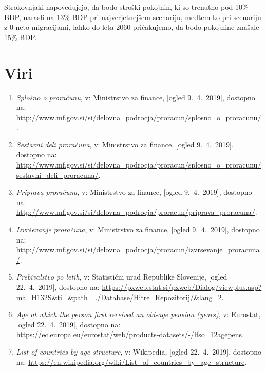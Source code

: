 \documentclass[12pt, a4paper]{article}
\begin{document}
\hspace*{5mm} Strokovnjaki napovedujejo, da bodo stroški pokojnin, ki so trenutno pod 10\% BDP, narasli na 13\% BDP pri najverjetnejšem scenariju, medtem ko pri scenariju z 0 neto migracijami, lahko do leta 2060 pričakujemo, da bodo pokojnine znašale 15\% BDP.

\newpage

\section[Viri]{Viri}
\begin{enumerate}
\item
\label{Splošno o proračunu}
\emph{Splošno o proračunu}, v: Ministrstvo za finance, [ogled 9.~4.~2019], dostopno na: \url{http://www.mf.gov.si/si/delovna_podrocja/proracun/splosno_o_proracunu/}.

\item
\label{Sestavni deli}
\emph{Sestavni deli proračuna}, v: Ministrstvo za finance, [ogled 9.~4.~2019], dostopno na: \url{http://www.mf.gov.si/si/delovna_podrocja/proracun/splosno_o_proracunu/sestavni_deli_proracuna/}.

\item
\label{Priprava proračuna}
\emph{Priprava proračuna}, v: Ministrstvo za finance, [ogled 9.~4.~2019], dostopno na: \url{http://www.mf.gov.si/si/delovna_podrocja/proracun/priprava_proracuna/}.

\item
\label{Izvrševanje proračuna}
\emph{Izvrševanje proračuna}, v: Ministrstvo za finance, [ogled 9.~4.~2019], dostopno na: \url{http://www.mf.gov.si/si/delovna_podrocja/proracun/izvrsevanje_proracuna/}.

\item
\label{Prebivalstvo Slovenije}
\emph{Prebivalstvo po letih}, v: Statistični urad Republike Slovenije, [ogled 22.~4.~2019], dostopno na: \url{https://pxweb.stat.si/pxweb/Dialog/viewplus.asp?ma=H132S&ti=&path=../Database/Hitre_Repozitorij/&lang=2}.

\item
\label{Eurostat pokojnine}
\emph{Age at which the person first received an old-age pension (years)}, v: Eurostat, [ogled 22.~4.~2019], dostopno na: \url{https://ec.europa.eu/eurostat/web/products-datasets/-/lfso_12agepens}.

\item
\label{Struktura prebivalstva}
\emph{List of countries by age structure}, v: Wikipedia, [ogled 22.~4.~2019], dostopno na: \url{https://en.wikipedia.org/wiki/List_of_countries_by_age_structure}.


\end{enumerate}
\end{document}
